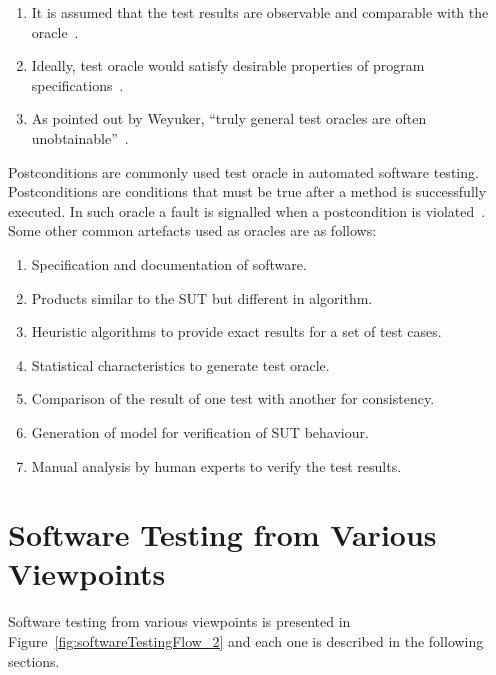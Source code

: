 \begin{enumerate}
\item It is assumed that the test results are observable and comparable with the oracle~\cite{weyuker1982testing}.
\item Ideally, test oracle would satisfy desirable properties of program specifications~\cite{baresi2001test}.
\item As pointed out by Weyuker, ``truly general test oracles are often unobtainable''~\cite{weyuker1982testing}. 
\end{enumerate}
\bigskip
Postconditions are commonly used test oracle in automated software testing. Postconditions are conditions that must be true after a method is successfully executed. In such oracle a fault is signalled when a postcondition is violated~\cite{meyer2009programs}. Some other common artefacts used as oracles are as follows:

\begin{enumerate}
\item Specification and documentation of software.
\item Products similar to the SUT but different in algorithm. %
\item Heuristic algorithms to provide exact results for a set of test cases. %
\item Statistical characteristics to generate test oracle. %
\item Comparison of the result of one test with another for consistency. %
\item Generation of model for verification of SUT behaviour. %
\item Manual analysis by human experts to verify the test results. %
\end{enumerate}

\section{Software Testing from Various Viewpoints}
Software testing from various viewpoints is presented in Figure~\ref{fig:softwareTestingFlow_2} and each one is described in the following sections.

